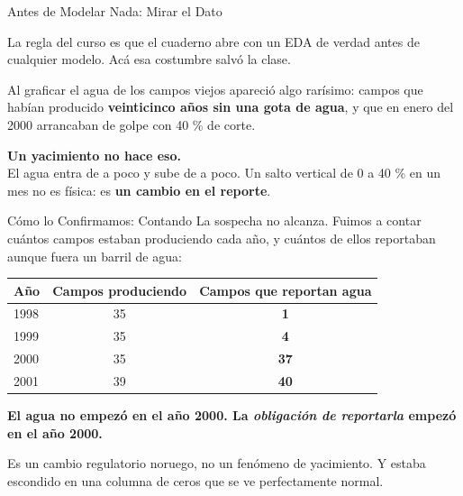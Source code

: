 \documentclass[aspectratio=169, 11pt]{beamer}
\begin{document}
\begin{frame}[shrink=20]{Antes de Modelar Nada: Mirar el Dato}
  \vspace{3pt}
  {\footnotesize\color{textMuted}
   La regla del curso es que el cuaderno abre con un EDA de verdad antes de
   cualquier modelo. Acá esa costumbre salvó la clase.
   \vspace{3pt}

   Al graficar el agua de los campos viejos apareció algo rarísimo: campos que
   habían producido \textbf{veinticinco años sin una gota de agua}, y que en
   enero del 2000 arrancaban de golpe con 40 \% de corte.}
  \vspace{3pt}
  \begin{tcolorbox}[colback=arcaGray, colframe=arcaRed, boxrule=0pt,
    leftrule=4pt, arc=3pt, left=10pt, right=10pt, top=4pt, bottom=4pt]
    {\footnotesize\color{arcaDark}\bfseries
     Un yacimiento no hace eso.}\\[5pt]
    {\footnotesize\color{textMuted}
     El agua entra de a poco y sube de a poco. Un salto vertical de 0 a 40 \%
     en un mes no es física: es \textbf{un cambio en el reporte}.}
  \end{tcolorbox}
\end{frame}

\begin{frame}[shrink=8]{Cómo lo Confirmamos: Contando}
  \vspace{4pt}
  {\footnotesize\color{textMuted}
   La sospecha no alcanza. Fuimos a contar cuántos campos estaban produciendo
   cada año, y cuántos de ellos reportaban aunque fuera un barril de agua:}
  \vspace{8pt}
  \begin{center}
  {\footnotesize
  \begin{tabular}{lcc}
    \toprule
    \textbf{Año} & \textbf{Campos produciendo} & \textbf{Campos que reportan agua} \\
    \midrule
    1998 & 35 & \textcolor{arcaRed}{\textbf{1}} \\
    1999 & 35 & \textcolor{arcaRed}{\textbf{4}} \\
    2000 & 35 & \textcolor{codeGreen}{\textbf{37}} \\
    2001 & 39 & \textcolor{codeGreen}{\textbf{40}} \\
    \bottomrule
  \end{tabular}}
  \end{center}
  \vspace{9pt}
  {\footnotesize\color{arcaDark}\bfseries
   El agua no empezó en el año 2000. La \emph{obligación de reportarla}
   empezó en el año 2000.}
  \vspace{6pt}

  {\scriptsize\color{textMuted}
   Es un cambio regulatorio noruego, no un fenómeno de yacimiento. Y estaba
   escondido en una columna de ceros que se ve perfectamente normal.}
\end{frame}
\end{document}
